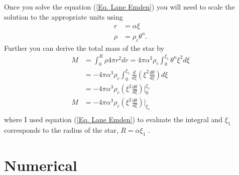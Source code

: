 \documentclass{article}
\begin{document}
Once you solve the equation (\ref{Eq. Lane Emden}) you will need to scale the solution to the appropriate units using
\begin{align*}
r & = \alpha \xi \\
\rho & = \rho_c \theta^n.
\end{align*}
Further you can derive the total mass of the star by
\begin{align*}
M &= \int_0^R \rho 4\pi r^2 dr =4\pi\alpha^3\rho_c \int_0^{\xi_1} \theta^n \xi^2 d\xi \\
& = -4\pi\alpha^3\rho_c \int_0^{\xi_1} \frac{d}{d\xi}\left(\xi^2 \frac{d\theta}{d\xi}\right) d\xi\\
& = -4\pi\alpha^3\rho_c \left(\xi^2 \frac{d\theta}{d\xi}\right)\bigg|_0^{\xi_1}\\
M & = -4\pi\alpha^3\rho_c \left(\xi^2 \frac{d\theta}{d\xi}\right)\bigg|_{\xi_1}\\
\end{align*}
where I used equation (\ref{Eq. Lane Emden}) to evaluate the integral and $\xi_1$ corresponds to the radius of the star, $R=\alpha \xi_1$ .

\section{Numerical}
\end{document}
